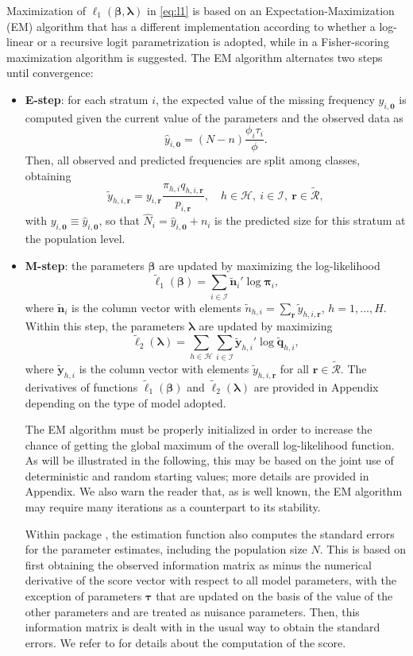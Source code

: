 Maximization of $\ell_1(\bm{\beta},\bm{\lambda})$ in \eqref{eq:l1} is based on an Expectation-Maximization (EM) algorithm \citep{demp:lair:rubi:77} that has a different implementation according to whether a log-linear or a recursive logit parametrization is adopted, while in \cite{bartolucci2024estimating} a Fisher-scoring maximization algorithm is suggested.
The EM algorithm alternates two steps until convergence:
%
\begin{itemize}
%
\item {\bf E-step}: for each stratum $i$, the expected value of the missing frequency $y_{i,\bm{0}}$ is computed given the current value of the parameters and the observed data as
\[
\hat{y}_{i,\bm{0}} = (N-n)\frac{\phi_i\tau_i}{\phi}.
\]
Then, all observed and predicted frequencies are split among classes, obtaining
\[
\tilde{y}_{h,i,\bm{r}} = y_{i,\bm{r}}\frac{\pi_{h,i}q_{h,i,\bm{r}}}{p_{i,\bm{r}}},\quad h\in\mathcal{H},\: i\in\mathcal{I},\:\bm{r}\in\tilde{\mathcal{R}},
\]
with $y_{i,\bm{0}}\equiv\hat{y}_{i,\bm{0}}$, so that $\hat{N}_i=\hat{y}_{i,\bm{0}}+n_i$ is the predicted size for this stratum at the population level.
%
\item {\bf M-step}: the parameters $\bm{\beta}$ are updated by maximizing the log-likelihood
\[
\tilde{\ell}_1(\bm{\beta})=\sum_{i\in\mathcal{I}} \tilde{\bm{n}}_i'\log\bm\pi_i,
\]
where $\tilde{\bm{n}}_i$ is the column vector with elements $\tilde{n}_{h,i}=\sum_{\bm{r}}\tilde{y}_{h,i,\bm{r}}$, $h=1,\ldots,H$.
Within this step, the parameters $\bm{\lambda}$ are updated by maximizing
\[
\tilde{\ell}_2(\bm{\lambda}) = \sum_{h\in\mathcal{H}}\sum_{i\in\mathcal{I}}\tilde{\bm{y}}_{h,i}'\log\tilde{\bm{q}}_{h,i},
\]
where $\tilde{\bm{y}}_{h,i}$ is the column vector with elements $\tilde{y}_{h,i,\bm{r}}$ for all $\bm{r}\in\tilde{\mathcal{R}}$.
The derivatives of functions $\tilde{\ell}_1(\bm{\beta})$ and $\tilde{\ell}_2(\bm{\lambda})$ are provided in Appendix depending on the type of model adopted.

The EM algorithm must be properly initialized in order to increase the chance of getting the global maximum of the overall log-likelihood function.
As will be illustrated in the following, this may be based on the joint use of deterministic and random starting values; more details are provided in Appendix.
We also warn the reader that, as is well known, the EM algorithm may require many iterations as a counterpart to its stability.

Within package , the estimation function also computes the standard errors for the parameter estimates, including the population size $N$.
This is based on first obtaining the observed information matrix as minus the numerical derivative of the score vector with respect to all model parameters, with the exception of parameters $\bm{\tau}$ that are updated on the basis of the value of the other parameters and are treated as nuisance parameters.
Then, this information matrix is dealt with in the usual way to obtain the standard errors.
We refer to \cite{bartolucci2024estimating} for details about the computation of the score.
%
\end{itemize}
%
